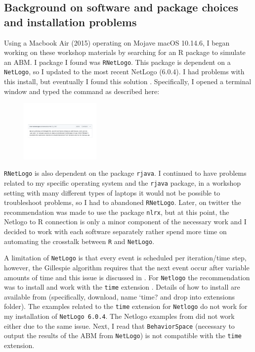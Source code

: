 \documentclass[11pt, oneside]{article}   	%
\begin{document}
\subsection{Background on software and package choices and installation problems}

Using a Macbook Air (2015) operating on Mojave macOS 10.14.6, I began working on these workshop materials by searching for an R package to simulate an ABM. I package I found was \texttt{RNetLogo}. This package is dependent on a \texttt{NetLogo}, so I updated to the most recent NetLogo (6.0.4). I had problems with this install, but eventually I found this solution \cite{soln}. Specifically, I opened a terminal window and typed the command as described here:

\begin{figure}[!ht]
\includegraphics[height=3cm]{workaround}
\end{figure}

\texttt{RNetLogo} is also dependent on the package \texttt{rjava}. I continued to have problems related to my specific operating system and the \texttt{rjava} package, in a workshop setting with many different types of laptops it would not be possible to troubleshoot problems, so I had to abandoned \texttt{RNetLogo}. Later, on twitter the recommendation was made to use the package \texttt{nlrx}, but at this point, the Netlogo to R connection is only a minor component of the necessary work and I decided to work with each software separately rather spend more time on automating the crosstalk between \texttt{R} and \texttt{NetLogo}.

A limitation of \texttt{NetLogo} is that every event is scheduled per iteration/time step, however, the Gillespie algorithm requires that the next event occur after variable amounts of time and this issue is discussed in \citealt{Warnke}. For \texttt{Netlogo} the recommendation was to install and work with the \texttt{time} extension \citep{time}. Details of how to install are available from \cite{time} (specifically, download, name `time? and drop into extensions folder). The examples related to the \texttt{time} extension for \texttt{Netlogo} do not work for my installation of \texttt{NetLogo 6.0.4}. The Netlogo examples from \cite{Warnke} did not work either due to the same issue. Next, I read that \texttt{BehaviorSpace} (necessary to output the results of the ABM from \texttt{NetLogo}) is not compatible with the \texttt{time} extension.
\end{document}
